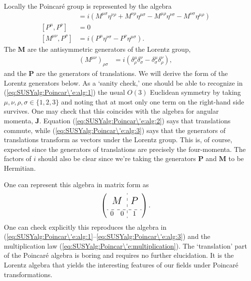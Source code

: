 \documentclass[12pt, oneside]{report}    %
\begin{document}
Locally the Poincar\'e group is represented by the algebra
\begin{align}
    [M^{\mu\nu},M^{\rho\sigma}] &= i(M^{\mu\sigma}\eta^{\nu\rho}+ M^{\nu\rho}\eta^{\mu\sigma} - M^{\mu\rho}\eta^{\nu\sigma} - M^{\nu\sigma}\eta^{\mu\rho})\label{eq:SUSYalg:Poincar\'e:alg:1}\\
    [P^\mu,P^\nu] &= 0\label{eq:SUSYalg:Poincar\'e:alg:2}\\
    [M^{\mu\nu}, P^\sigma] &= i(P^\mu\eta^{\nu\sigma}-P^\nu\eta^{\mu\sigma}).\label{eq:SUSYalg:Poincar\'e:alg:3}
\end{align}
The $\mathbf{M}$ are the antisymmetric generators of the Lorentz group,
\begin{align}
(M^{\mu\nu})_{\rho\sigma}&=i(\delta^\mu_\rho\delta^\nu_\sigma-\delta^\mu_\sigma\delta^\nu_\rho),\label{eq:SUSYalg:LorentzGenerators}
\end{align}
and the $\mathbf P$ are the generators of translations. We will derive the form of the Lorentz generators below. As a `sanity check,' one should be able to recognize in  (\ref{eq:SUSYalg:Poincar\'e:alg:1}) the usual $O(3)$ Euclidean symmetry  by taking $\mu,\nu,\rho,\sigma \in \{1,2,3\}$ and noting that at most only one term on the right-hand side survives. One may check that this coincides with the algebra for angular momenta, $\mathbf J$.  Equation (\ref{eq:SUSYalg:Poincar\'e:alg:2}) says that translations commute, while  (\ref{eq:SUSYalg:Poincar\'e:alg:3}) says that the generators of translations transform as vectors under the Lorentz group. This is, of course, expected since the generators of translations are precisely the four-momenta. The factors of $i$ should also be clear since we're taking the generators $\mathbf{P}$ and $\mathbf{M}$ to be Hermitian. 

One can represent this algebra in matrix form as
\begin{align}
    \left(
    \begin{array}{cc:c}
    \multicolumn{2}{c:}{\multirow{2}{*}{\Large{$M$}}} & \multicolumn{1}{c}{\multirow{2}{*}{\Large{$P$}}} \\
     &&  \\
    \hdashline
    0 & 0 & 1
    \end{array}
    \right).
\end{align}
One can check explicitly this reproduces the algebra in (\ref{eq:SUSYalg:Poincar\'e:alg:1}--\ref{eq:SUSYalg:Poincar\'e:alg:3}) and the multiplication law (\ref{eq:SUSYalg:Poincar\'e:multiplication}).
%
The `translation' part of the Poincar\'e algebra is boring and requires no further elucidation. It is the Lorentz algebra that yields the interesting features of our fields under Poincar\'e transformations.
\end{document}
